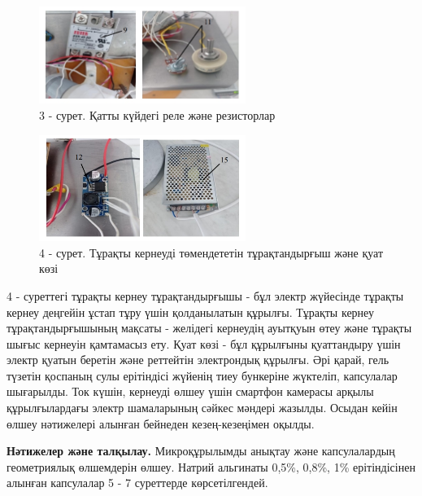 \begin{figure}[H]
	\centering
	\includegraphics[width=0.6\textwidth]{media/pish/image24}
	\caption*{3 - сурет. Қатты күйдегі реле және резисторлар}
\end{figure}
\begin{figure}[H]
	\centering
	\includegraphics[width=0.6\textwidth]{media/pish/image25}
	\caption*{4 - сурет. Тұрақты кернеуді төмендететін тұрақтандырғыш және қуат көзі}
\end{figure}

\begin{multicols}{2}
4 - суреттегі тұрақты кернеу тұрақтандырғышы - бұл электр жүйесінде
тұрақты кернеу деңгейін ұстап тұру үшін қолданылатын құрылғы. Тұрақты
кернеу тұрақтандырғышының мақсаты - желідегі кернеудің ауытқуын өтеу
және тұрақты шығыс кернеуін қамтамасыз ету. Қуат көзі - бұл құрылғыны
қуаттандыру үшін электр қуатын беретін және реттейтін электрондық
құрылғы. Әрі қарай, гель түзетін қоспаның сулы ерітіндісі жүйенің тиеу
бункеріне жүктеліп, капсулалар шығарылды. Ток күшін, кернеуді өлшеу үшін
смартфон камерасы арқылы құрылғылардағы электр шамаларының сәйкес
мәндері жазылды. Осыдан кейін өлшеу нәтижелері алынған бейнеден
кезең-кезеңімен оқылды.

{\bfseries Нәтижелер және талқылау.} Микроқұрылымды анықтау және
капсулалардың геометриялық өлшемдерін өлшеу. Натрий альгинаты 0,5\%,
0,8\%, 1\% ерітіндісінен алынған капсулалар 5 - 7 суреттерде
көрсетілгендей.
\end{multicols}


